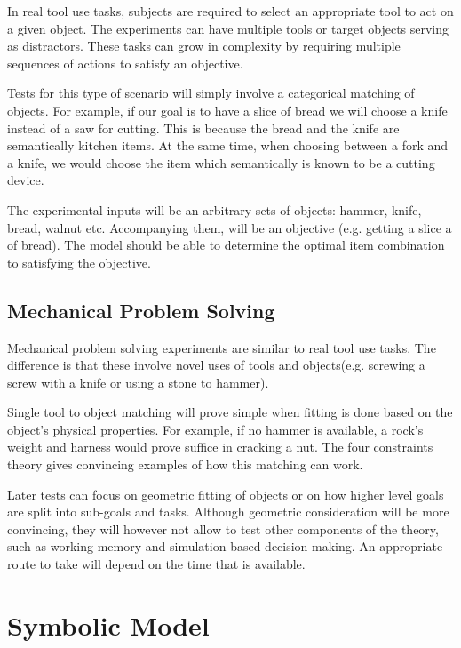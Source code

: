\documentclass[11]{article}
\begin{document}
In real tool use tasks, subjects are required to select an appropriate tool to act on a given object\cite{baumard2014}. The experiments can have multiple tools or target objects serving as distractors. These tasks can grow in complexity by requiring multiple sequences of actions to satisfy an objective.

Tests for this type of scenario will simply involve a categorical matching of objects. For example, if our goal is to have a slice of bread we will choose a knife instead of a saw for cutting. This is because the bread and the knife are semantically kitchen items. At the same time, when choosing between a fork and a knife, we would choose the item which semantically is known to be a cutting device. 

The experimental inputs will be an arbitrary sets of objects: hammer, knife, bread, walnut etc. Accompanying them, will be an objective (e.g. getting a slice a of bread). The model should be able to determine the optimal item combination to satisfying the objective. 

\subsection{Mechanical Problem Solving}

Mechanical problem solving experiments are similar to real tool use tasks. The difference is that these involve novel uses of tools and objects(e.g. screwing a screw with a knife\cite{baumard2014} or using a stone to hammer\cite{zhu2015}). 

Single tool to object matching will prove simple when fitting is done based on the object's physical properties. For example, if no hammer is available, a rock's weight and harness would prove suffice in cracking a nut. The four constraints theory gives convincing examples of how this matching can work. 

Later tests can focus on geometric fitting of objects or on how higher level goals are split into sub-goals and tasks. Although geometric consideration will be more convincing, they will however not allow to test other components of the theory, such as working memory and simulation based decision making. An appropriate route to take will depend on the time that is available. 

\section{Symbolic Model}
\end{document}
